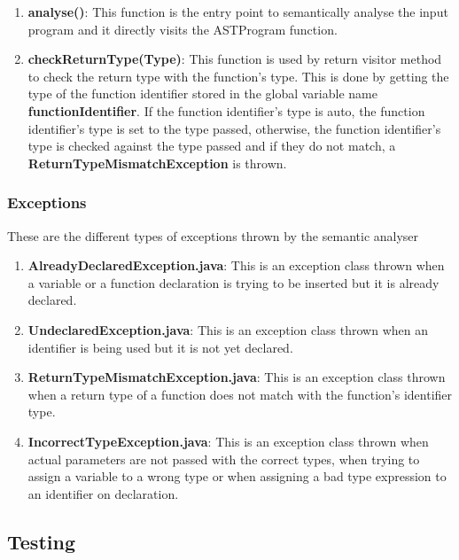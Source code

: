 \documentclass{article}
\begin{document}
\begin{enumerate}
	
						\item \textbf{analyse()}: This function is the entry point to semantically analyse the input program and it directly visits the ASTProgram function.
						
						
					\item \textbf{checkReturnType(Type)}: This function is used by return visitor method to check the return type with the function's type. This is done by getting the type of the function identifier stored in the global variable name \textbf{functionIdentifier}. If the function identifier's type is auto, the function identifier's type is set to the type passed, otherwise, the function identifier's type is checked against the type passed and if they do not match, a \textbf{ReturnTypeMismatchException} is thrown.
						
				\end{enumerate}
			
			\subsubsection{Exceptions}
			
			These are the different types of exceptions thrown by the semantic analyser
			
			\begin{enumerate}
			\item \textbf{AlreadyDeclaredException.java}: This is an exception class thrown when a variable or a function declaration is trying to be inserted but it is already declared.
			\item \textbf{UndeclaredException.java}: This is an exception class thrown when an identifier is being used but it is not yet declared.
			\item \textbf{ReturnTypeMismatchException.java}: This is an exception class thrown when a return type of a function does not match with the function's identifier type.
			\item \textbf{IncorrectTypeException.java}: This is an exception class thrown when actual parameters are not passed with the correct types, when trying to assign a variable to a wrong type or when assigning a bad type expression to an identifier on declaration.
			\end{enumerate}
			
			\subsection{Testing}
			
\end{document}

